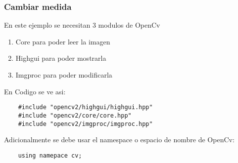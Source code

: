 \begin{frame}[fragile]
   \frametitle{Cambiar medida}

        En este ejemplo se necesitan 3 modulos de OpenCv

        \begin{enumerate}
            \item Core para poder leer la imagen
            \item Highgui para poder mostrarla
            \item Imgproc para poder modificarla
        \end{enumerate}

        \vspace{1cm}

        En Codigo se ve asi:

        \begin{lstlisting}
    #include "opencv2/highgui/highgui.hpp"
    #include "opencv2/core/core.hpp"
    #include "opencv2/imgproc/imgproc.hpp"
        \end{lstlisting}

        Adicionalmente se debe usar el namespace o espacio de nombre de OpenCv:

        \begin{lstlisting}
    using namepace cv;
        \end{lstlisting}
\end{frame}

